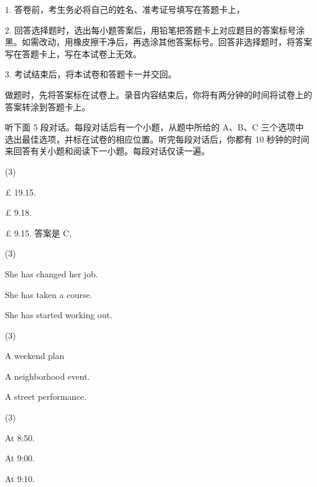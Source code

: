 \documentclass{英语试卷}
\begin{document}
\begin{notice}
\par 1. 答卷前，考生务必将自己的姓名、准考证号填写在答题卡上，\par
\par 2. 回答选择题时，选出每小题答案后，用铅笔把答题卡上对应题目的答案标号涂黑。如需改动，用橡皮擦干净后，再选涂其他答案标号。回答非选择题时，将答案写在答题卡上，写在本试卷上无效。\par
\par 3. 考试结束后，将本试卷和答题卡一并交回。\par
\end{notice}
\par 做题时，先将答案标在试卷上。录音内容结束后，你将有两分钟的时间将试卷上的答案转涂到答题卡上。\par
{}
\par 听下面 5 段对话。每段对话后有一个小题，从题中所给的 A、B、C 三个选项中选出最佳选项，并标在试卷的相应位置。听完每段对话后，你都有 10 秒钟的时间来回答有关小题和阅读下一小题。每段对话仅读一遍。\par
{}
\begin{choices}(3)
  \item £ 19.15.
  \item £ 9.18.
  \item £ 9.15. 答案是 C,
\end{choices}
\begin{choices}(3)
  \item She has changed her job.
  \item She has taken a course.
  \item She has started working out.
\end{choices}
\begin{choices}(3)
  \item A weekend plan
  \item A neighborhood event.
  \item A street performance.
\end{choices}
\begin{choices}(3)
  \item At 8:50.
  \item At 9:00.
  \item At 9:10.
\end{choices}
\end{document}
